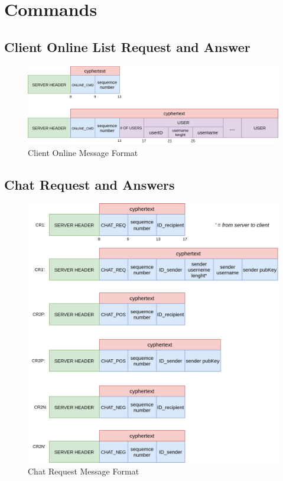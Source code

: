\documentclass[11pt]{report}
\begin{document}
\section{Commands}
\subsection*{Client Online List Request and Answer }
\begin{figure}[H]
	\centering
	\includegraphics[scale=0.25]{img/ClientOnline_messageFormat.png}
	\caption{Client Online Message Format}
	\label {img: FormatClientOnline}
\end{figure}

\subsection*{Chat Request and Answers}
\begin{figure}[H]
	\centering
	\includegraphics[scale=0.28]{img/ChatRequest_messageFormat.png}
	\caption{Chat Request Message Format}
	\label {img: FormatChatRequest}
\end{figure}
\newpage
\end{document}
